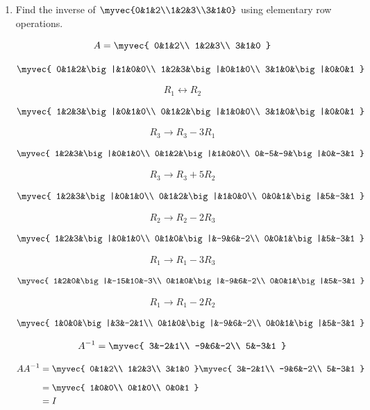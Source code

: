 \begin{enumerate}[label=\thesubsection.\arabic*, ref=\thesubsection.\theenumi]
    \item
    \label{question:C12-Q30}
    \label{question-short:C12-Q30} Find the inverse of $\myvec{0&1&2\\1&2&3\\3&1&0}$ using elementary row operations.

    \par
    \smallskip
    \solution

\[
A=\myvec{
0&1&2\\
1&2&3\\
3&1&0
}
\]

\[
\myvec{
0&1&2&\big|&1&0&0\\
1&2&3&\big|&0&1&0\\
3&1&0&\big|&0&0&1
}
\]

\[
R_1\leftrightarrow R_2
\]

\[
\myvec{
1&2&3&\big|&0&1&0\\
0&1&2&\big|&1&0&0\\
3&1&0&\big|&0&0&1
}
\]

\[
R_3\rightarrow R_3-3R_1
\]

\[
\myvec{
1&2&3&\big|&0&1&0\\
0&1&2&\big|&1&0&0\\
0&-5&-9&\big|&0&-3&1
}
\]

\[
R_3\rightarrow R_3+5R_2
\]

\[
\myvec{
1&2&3&\big|&0&1&0\\
0&1&2&\big|&1&0&0\\
0&0&1&\big|&5&-3&1
}
\]

\[
R_2\rightarrow R_2-2R_3
\]

\[
\myvec{
1&2&3&\big|&0&1&0\\
0&1&0&\big|&-9&6&-2\\
0&0&1&\big|&5&-3&1
}
\]

\[
R_1\rightarrow R_1-3R_3
\]

\[
\myvec{
1&2&0&\big|&-15&10&-3\\
0&1&0&\big|&-9&6&-2\\
0&0&1&\big|&5&-3&1
}
\]

\[
R_1\rightarrow R_1-2R_2
\]

\[
\myvec{
1&0&0&\big|&3&-2&1\\
0&1&0&\big|&-9&6&-2\\
0&0&1&\big|&5&-3&1
}
\]

\[
A^{-1}=
\myvec{
3&-2&1\\
-9&6&-2\\
5&-3&1
}
\]

\[
\begin{aligned}
AA^{-1}
&=
\myvec{
0&1&2\\
1&2&3\\
3&1&0
}
\myvec{
3&-2&1\\
-9&6&-2\\
5&-3&1
}\\[6pt]
&=
\myvec{
1&0&0\\
0&1&0\\
0&0&1
}\\
&=I
\end{aligned}
\]



\end{enumerate}
